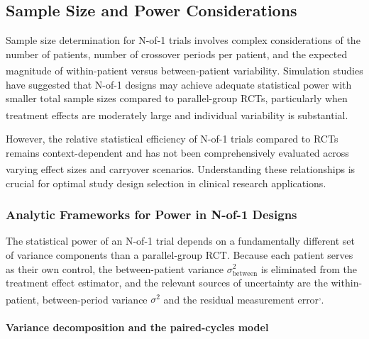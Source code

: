 \documentclass[
  11pt,
]{article}
\begin{document}
\subsection{Sample Size and Power
Considerations}\label{sample-size-and-power-considerations}

Sample size determination for N-of-1 trials involves complex
considerations of the number of patients, number of crossover periods
per patient, and the expected magnitude of within-patient versus
between-patient
variability\textsuperscript{}.
Simulation studies have suggested that N-of-1 designs may achieve
adequate statistical power with smaller total sample sizes compared to
parallel-group RCTs, particularly when treatment effects are moderately
large and individual variability is
substantial\textsuperscript{}.

However, the relative statistical efficiency of N-of-1 trials compared
to RCTs remains context-dependent and has not been comprehensively
evaluated across varying effect sizes and carryover
scenarios\textsuperscript{}.
Understanding these relationships is crucial for optimal study design
selection in clinical research applications.

\subsubsection{Analytic Frameworks for Power in N-of-1
Designs}\label{analytic-frameworks-for-power-in-n-of-1-designs}

The statistical power of an N-of-1 trial depends on a fundamentally
different set of variance components than a parallel-group RCT. Because
each patient serves as their own control, the between-patient variance
\(\sigma^2_{\text{between}}\) is eliminated from the treatment effect
estimator, and the relevant sources of uncertainty are the
within-patient, between-period variance \(\sigma^2\) and the residual
measurement
error\textsuperscript{,}.

\paragraph{Variance decomposition and the paired-cycles
model}\label{variance-decomposition-and-the-paired-cycles-model}
\end{document}
